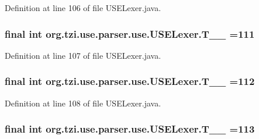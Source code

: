 Definition at line 106 of file U\-S\-E\-Lexer.\-java.

\hypertarget{classorg_1_1tzi_1_1use_1_1parser_1_1use_1_1_u_s_e_lexer_ab07a298f43f377c2937b3738c9e2dcc0}{
\subsubsection[{T\-\_\-\-\_\-111}]{\setlength{\rightskip}{0pt plus 5cm}final int org.\-tzi.\-use.\-parser.\-use.\-U\-S\-E\-Lexer.\-T\-\_\-\-\_ =111\hspace{0.3cm}{\ttfamily [static]}}}\label{classorg_1_1tzi_1_1use_1_1parser_1_1use_1_1_u_s_e_lexer_ab07a298f43f377c2937b3738c9e2dcc0}


Definition at line 107 of file U\-S\-E\-Lexer.\-java.

\hypertarget{classorg_1_1tzi_1_1use_1_1parser_1_1use_1_1_u_s_e_lexer_aa1db1cf1653ecc600386b2c435ca6018}{
\subsubsection[{T\-\_\-\-\_\-112}]{\setlength{\rightskip}{0pt plus 5cm}final int org.\-tzi.\-use.\-parser.\-use.\-U\-S\-E\-Lexer.\-T\-\_\-\-\_ =112\hspace{0.3cm}{\ttfamily [static]}}}\label{classorg_1_1tzi_1_1use_1_1parser_1_1use_1_1_u_s_e_lexer_aa1db1cf1653ecc600386b2c435ca6018}


Definition at line 108 of file U\-S\-E\-Lexer.\-java.

\hypertarget{classorg_1_1tzi_1_1use_1_1parser_1_1use_1_1_u_s_e_lexer_a111437311315d941ee5513bd138cfdf7}{
\subsubsection[{T\-\_\-\-\_\-113}]{\setlength{\rightskip}{0pt plus 5cm}final int org.\-tzi.\-use.\-parser.\-use.\-U\-S\-E\-Lexer.\-T\-\_\-\-\_ =113\hspace{0.3cm}{\ttfamily [static]}}}\label{classorg_1_1tzi_1_1use_1_1parser_1_1use_1_1_u_s_e_lexer_a111437311315d941ee5513bd138cfdf7}


